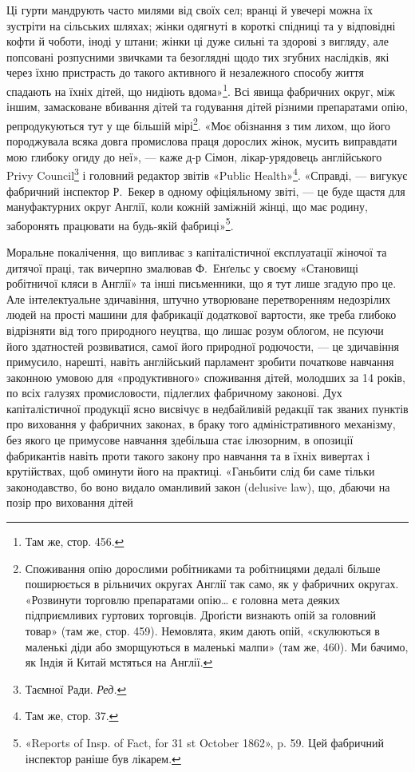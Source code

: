 \parcont{}  %
Ці гурти мандрують часто милями від своїх сел; вранці й увечері
можна їх зустріти на сільських шляхах; жінки одягнуті в короткі
спідниці та у відповідні кофти й чоботи, іноді у штани; жінки ці
дуже сильні та здорові з вигляду, але попсовані розпусними
звичками та безоглядні щодо тих згубних наслідків, які через
їхню пристрасть до такого активного й незалежного способу
життя спадають на їхніх дітей, що нидіють вдома»\footnote{
Там же, стор. 456.
}. Всі явища
фабричних округ, між іншим, замасковане вбивання дітей та
годування дітей різними препаратами опію, репродукуються тут
у ще більшій мірі\footnote{
Споживання опію дорослими робітниками та робітницями дедалі
більше поширюється в рільничих округах Англії так само, як у фабричних
округах. «Розвинути торговлю препаратами опію\dots{} є головна мета
деяких підприємливих гуртових торговців. Дроґісти визнають опій за
головний товар» (там же, стор. 459). Немовлята, яким дають опій, «скулюються
в маленькі діди або зморщуються в маленькі малпи» (там же,
\stor{}460). Ми бачимо, як Індія й Китай мстяться на Англії.
}. «Моє обізнання з тим лихом, що його породжувала
всяка довга промислова праця дорослих жінок, мусить
виправдати мою глибоку огиду до неї», — каже д-р Сімон,
лікар-урядовець англійського Privy Council\footnote*{
Таємної Ради. \emph{Ред.}
} і головний редактор
звітів «Public Health»\footnote{
Там же, стор. 37.
}. «Справді, — вигукує фабричний
інспектор Р.~Бекер в одному офіціяльному звіті, — це буде
щастя для мануфактурних округ Англії, коли кожній заміжній
жінці, що має родину, заборонять працювати на будь-якій
фабриці»\footnote{
«Reports of Insp. of Fact, for 31 st October 1862», p. 59. Цей фабричний
інспектор раніше був лікарем.
}.

Моральне покалічення, що випливає з капіталістичної експлуатації
жіночої та дитячої праці, так вичерпно змалював Ф.~Енґельс
у своєму «Становищі робітничої кляси в Англії» та інші письменники,
що я тут лише згадую про це. Але інтелектуальне здичавіння,
штучно утворюване перетворенням недозрілих людей на
прості машини для фабрикації додаткової вартости, яке треба
глибоко відрізняти від того природного неуцтва, що лишає розум
облогом, не псуючи його здатностей розвиватися, самої його природної
родючости, — це здичавіння примусило, нарешті, навіть
англійський парламент зробити початкове навчання законною
умовою для «продуктивного» споживання дітей, молодших за
14 років, по всіх галузях промисловости, підлеглих фабричному
законові. Дух капіталістичної продукції ясно висвічує в недбайливій
редакції так званих пунктів про виховання у фабричних
законах, в браку того адміністративного механізму, без якого це
примусове навчання здебільша стає ілюзорним, в опозиції фабрикантів
навіть проти такого закону про навчання та в їхніх вивертах
і крутійствах, щоб оминути його на практиці. «Ганьбити
слід би саме тільки законодавство, бо воно видало оманливий
закон (delusive law), що, дбаючи на позір про виховання дітей
\parbreak{}  %
